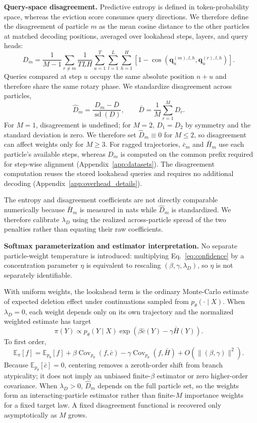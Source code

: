 \documentclass{article} %
\begin{document}
\textbf{Query-space disagreement.}
Predictive entropy is defined in token-probability space, whereas the eviction score consumes query directions. We therefore define the disagreement of particle $m$ as the mean cosine distance to the other particles at matched decoding positions, averaged over lookahead steps, layers, and query heads:
\begin{equation}
D_m=\frac{1}{M-1}\sum_{r\neq m}
\frac{1}{TLH}\sum_{u=1}^{T}\sum_{l=1}^{L}\sum_{h=1}^{H}
\left[1-\cos\!\left(\mathbf q^{(m),l,h}_u,\mathbf q^{(r),l,h}_u\right)\right].
\label{eq:disagreement}
\end{equation}
Queries compared at step $u$ occupy the same absolute position $n+u$ and therefore share the same rotary phase. We standardize disagreement across particles,
\begin{equation}
\hat D_m=\frac{D_m-\bar D}{\operatorname{sd}(D)},
\qquad
\bar D=\frac1M\sum_{r=1}^{M}D_r.
\label{eq:disagreement_z}
\end{equation}
For $M=1$, disagreement is undefined; for $M=2$, $D_1=D_2$ by symmetry and the standard deviation is zero. We therefore set $\hat D_m\equiv0$ for $M\le2$, so disagreement can affect weights only for $M\ge3$. For ragged trajectories, $\bar c_m$ and $\bar H_m$ use each particle's available steps, whereas $D_m$ is computed on the common prefix required for step-wise alignment (Appendix~\ref{app:datasets}). The disagreement computation reuses the stored lookahead queries and requires no additional decoding (Appendix~\ref{app:overhead_details}).

The entropy and disagreement coefficients are not directly comparable numerically because $\bar H_m$ is measured in nats while $\hat D_m$ is standardized. We therefore calibrate $\lambda_D$ using the realized across-particle spread of the two penalties rather than equating their raw coefficients.

\textbf{Softmax parameterization and estimator interpretation.}
No separate particle-weight temperature is introduced: multiplying Eq.~\eqref{eq:confidence} by a concentration parameter $\eta$ is equivalent to rescaling $(\beta,\gamma,\lambda_D)$, so $\eta$ is not separately identifiable.

With uniform weights, the lookahead term is the ordinary Monte-Carlo estimate of expected deletion effect under continuations sampled from $p_\theta(\cdot\mid X)$. When $\lambda_D=0$, each weight depends only on its own trajectory and the normalized weighted estimate has target
\[
\pi(Y)\propto p_\theta(Y\mid X)\exp\!\left(\beta\bar c(Y)-\gamma\bar H(Y)\right).
\]
To first order,
\[
\mathbb{E}_{\pi}[f]
=\mathbb{E}_{p_\theta}[f]
+\beta\operatorname{Cov}_{p_\theta}(f,\bar c)
-\gamma\operatorname{Cov}_{p_\theta}(f,\bar H)
+O(\|(\beta,\gamma)\|^2).
\]
Because $\mathbb{E}_{p_\theta}[\bar c]=0$, centering removes a zeroth-order shift from branch atypicality; it does not imply an unbiased finite-$\beta$ estimator or zero higher-order covariance. When $\lambda_D>0$, $\hat D_m$ depends on the full particle set, so the weights form an interacting-particle estimator rather than finite-$M$ importance weights for a fixed target law. A fixed disagreement functional is recovered only asymptotically as $M$ grows.
\end{document}
